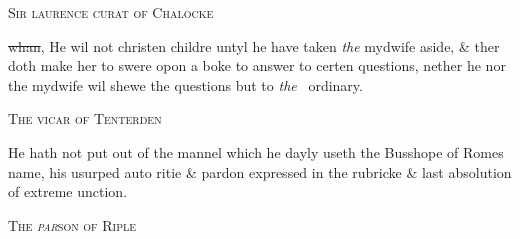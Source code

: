 \documentclass[12pt, a4paper]{book}
\begin{document}
            
               
				\begin{center} \begin{large} {\scshape Sir laurence curat of Chalocke} \end{large} \end{center}
			
            	
			
            		
		\ifthenelse{\isodd{\thepage}}
		{\reversemarginpar}
		{\normalmarginpar}
		\sout{whan}, He wil not christen childre untyl he have
 taken \textit{the} mydwife aside, \& ther doth make her to swere
 opon a boke to answer to certen questions, nether he
 nor the mydwife wil shewe the questions but to \textit{the} 
            		ordinary.
 
	
            
            	
				\begin{center} \begin{large} {\scshape The vicar of Tenterden} \end{large} \end{center}
			
		
			
				\marginpar[\vspace{0.5cm}{\textcolor{Gray}{the Busshope of Rome}}]{}
			
			
		\ifthenelse{\isodd{\thepage}}
		{\reversemarginpar}
		{\normalmarginpar}
		He hath not put out of the mannel which he dayly
		 useth the Busshope of Romes name, his usurped auto	 ritie \& pardon expressed in the rubricke \& last absolution
		 of extreme unction.
		
	
            
            	
				\begin{center} \begin{large} {\scshape The \textit{par}son of Riple} \end{large} \end{center}
			

		
			
				\marginpar[\vspace{0.5cm}{\textcolor{Gray}{pater noster in English}}]{}
			
			
				\marginpar[\vspace{0.5cm}{\textcolor{Gray}{n}}]{}
			
\end{document}
